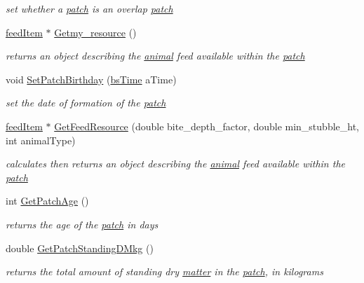 \begin{DoxyCompactItemize}
\begin{DoxyCompactList}\small\item\em set whether a \hyperlink{classpatch}{patch} is an overlap \hyperlink{classpatch}{patch} \item\end{DoxyCompactList}\item 
\hyperlink{classfeed_item}{feedItem} $\ast$ \hyperlink{classpatch_a81ef82ba67a54c62690a8b3139a2e3a8}{Getmy\_\-resource} ()
\begin{DoxyCompactList}\small\item\em returns an object describing the \hyperlink{classanimal}{animal} feed available within the \hyperlink{classpatch}{patch} \item\end{DoxyCompactList}\item 
void \hyperlink{classpatch_a9c53399ac48828cacb0fa4071952d9d4}{SetPatchBirthday} (\hyperlink{classbs_time}{bsTime} aTime)
\begin{DoxyCompactList}\small\item\em set the date of formation of the \hyperlink{classpatch}{patch} \item\end{DoxyCompactList}\item 
\hyperlink{classfeed_item}{feedItem} $\ast$ \hyperlink{classpatch_a2b8f90d5a3bb56be406d4225d477d8a5}{GetFeedResource} (double bite\_\-depth\_\-factor, double min\_\-stubble\_\-ht, int animalType)
\begin{DoxyCompactList}\small\item\em calculates then returns an object describing the \hyperlink{classanimal}{animal} feed available within the \hyperlink{classpatch}{patch} \item\end{DoxyCompactList}\item 
int \hyperlink{classpatch_af7300152fc005aa7b51ff74ec3824197}{GetPatchAge} ()
\begin{DoxyCompactList}\small\item\em returns the age of the \hyperlink{classpatch}{patch} in days \item\end{DoxyCompactList}\item 
double \hyperlink{classpatch_a9e9681c8b32bc2638268b3eb9f230772}{GetPatchStandingDMkg} ()
\begin{DoxyCompactList}\small\item\em returns the total amount of standing dry \hyperlink{classmatter}{matter} in the \hyperlink{classpatch}{patch}, in kilograms \item\end{DoxyCompactList}\item 

\end{DoxyCompactItemize}
